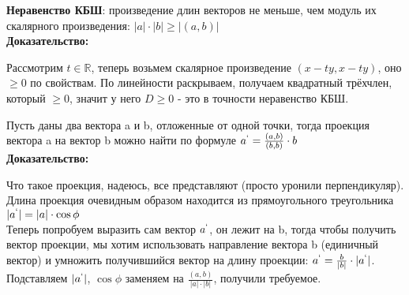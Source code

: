 \documentclass[12pt]{article}
\newcommand{\R}{\mathbb{R}}
\begin{document}
\begin{theorembox}
\textbf{Неравенство КБШ}: произведение длин векторов не меньше, чем модуль их скалярного произведения: $|a| \cdot |b| \geq |(a, b)|$\\

\textbf{Доказательство:}

Рассмотрим $t \in \R$, теперь возьмем скалярное произведение $(x - ty, x- ty)$, оно $\geq 0$ по свойствам. По линейности раскрываем, получаем квадратный трёхчлен, который $\geq 0$, значит у него $D \geq 0$ - это в точности неравенство КБШ.
\end{theorembox}

\begin{theorembox}
Пусть даны два вектора a и b, отложенные от одной точки, тогда проекция вектора a на вектор b можно найти по формуле $a^` = \frac{(a, b)}{(b, b)} \cdot b$\\

\textbf{Доказательство:}

Что такое проекция, надеюсь, все представляют (просто уронили перпендикуляр). Длина проекция очевидным образом находится из прямоугольного треугольника $|a^`| = |a| \cdot \cos{\phi}$\\

Теперь попробуем выразить сам вектор $a^`$, он лежит на b, тогда чтобы получить вектор проекции, мы хотим использовать направление вектора b (единичный вектор) и умножить получившийся вектор на длину проекции: $a^` = \frac{b}{|b|} \cdot |a^`|$. Подставляем $|a^`|$, $\cos{\phi}$ заменяем на $\frac{(a, b)}{|a| \cdot |b|}$, получили требуемое.

\end{theorembox}
\end{document}
